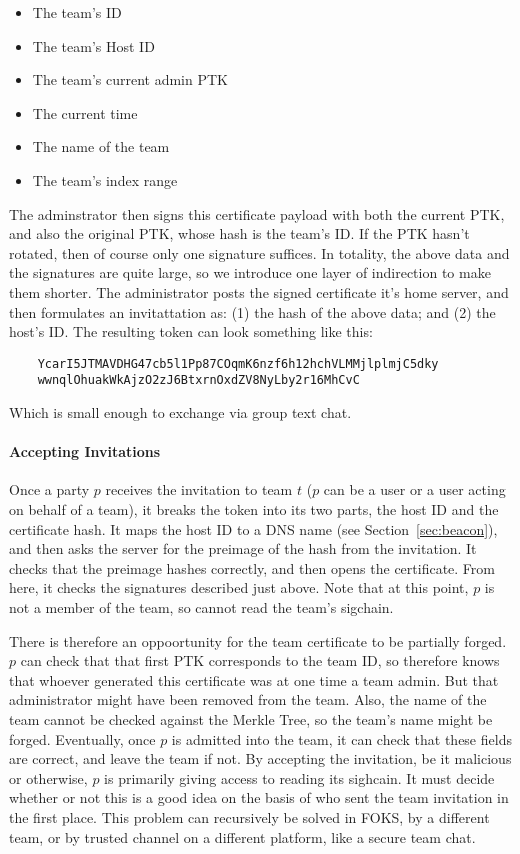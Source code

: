 \begin{itemize}[noitemsep]
    \item The team's ID
    \item The team's Host ID
    \item The team's current admin PTK
    \item The current time
    \item The name of the team
    \item The team's index range
\end{itemize}
%
The adminstrator then signs this certificate payload with both the current PTK, 
and also the original PTK, whose hash is the team's ID.  If the PTK hasn't rotated,
then of course only one signature suffices. In totality, the above data and the signatures
are quite large, so we introduce one layer of indirection to make them shorter. 
The administrator posts the signed certificate it's home server, and then formulates
an invitattation as: (1) the hash of the above data; and (2) the host's ID. The
resulting token can look something like this:
%
\begin{verbatim}
    YcarI5JTMAVDHG47cb5l1Pp87COqmK6nzf6h12hchVLMMjlplmjC5dky
    wwnqlOhuakWkAjzO2zJ6BtxrnOxdZV8NyLby2r16MhCvC
\end{verbatim}
% 
Which is small enough to exchange via group text chat.


\paragraph{Accepting Invitations}

Once a party $p$ receives the invitation to team $t$ ($p$ can be a user or a
user acting on behalf of a team), it breaks the token into its two parts, the
host ID and the certificate hash. It maps the host ID to a DNS name (see
Section~\ref{sec:beacon}), and then asks the server for the preimage of the hash
from the invitation. It checks that the preimage hashes correctly, and then
opens the certificate. From here, it checks the signatures described just above.
Note that at this point, $p$ is not a member of the team, so cannot read the
team's sigchain. 

There is therefore an oppoortunity for the team certificate to be partially
forged. $p$ can check that that first PTK corresponds to the team ID, so
therefore knows that whoever generated this certificate was at one time a team
admin.  But that administrator might have been removed from the team. Also, the
name of the team cannot be checked against the Merkle Tree, so the team's name
might be forged. Eventually, once $p$ is admitted into the team, it can check
that these fields are correct, and leave the team if not.  By accepting the
invitation, be it malicious or otherwise, $p$ is primarily giving access to
reading its sighcain. It must decide whether or not this is a good idea on the
basis of who sent the team invitation in the first place. This problem can
recursively be solved in FOKS, by a different team, or by trusted channel on a
different platform, like a secure team chat.

